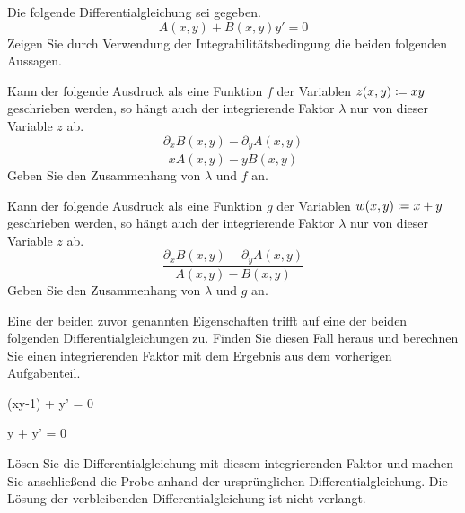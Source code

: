 \begin{atiTask}[
	title = Integrierende Faktoren,
	topic = Gewöhnliche Differentialgleichungen,
	subtopic = Exakte Differentialgleichungen: Der integrierende Faktor,
	language = Deutsch
]
	\begin{atiSubtasks}
		\item{
			Die folgende Differentialgleichung sei gegeben.
			\[
				A(x,y) + B(x,y)y' = 0
			\]
			Zeigen Sie durch Verwendung der Integrabilitätsbedingung die beiden folgenden Aussagen.
			\begin{atiItems}
				\item{
					Kann der folgende Ausdruck als eine Funktion $f$ der Variablen $z(x,y)\coloneqq xy$ geschrieben werden, so hängt auch der integrierende Faktor $\lambda$ nur von dieser Variable $z$ ab.
					\[
						\frac{\partial_x B(x,y) - \partial_y A(x,y)}{xA(x,y)-yB(x,y)}
					\]
					Geben Sie den Zusammenhang von $\lambda$ und $f$ an.
				}
				\item{
					Kann der folgende Ausdruck als eine Funktion $g$ der Variablen $w(x,y)\coloneqq x + y$ geschrieben werden, so hängt auch der integrierende Faktor $\lambda$ nur von dieser Variable $z$ ab.
					\[
						\frac{\partial_x B(x,y) - \partial_y A(x,y)}{A(x,y)-B(x,y)}
					\]
					Geben Sie den Zusammenhang von $\lambda$ und $g$ an.

				}
			\end{atiItems}
		}
		\item{
			Eine der beiden zuvor genannten Eigenschaften trifft auf eine der beiden folgenden Differentialgleichungen zu.
			Finden Sie diesen Fall heraus und berechnen Sie einen integrierenden Faktor mit dem Ergebnis aus dem vorherigen Aufgabenteil.
			\begin{atiSubequations}
				\item{
					(xy-1) + y' = 0
				}
				\item{
					y + y' = 0
				}
			\end{atiSubequations}
			Lösen Sie die Differentialgleichung mit diesem integrierenden Faktor und machen Sie anschließend die Probe anhand der ursprünglichen Differentialgleichung.
			Die Lösung der verbleibenden Differentialgleichung ist nicht verlangt.
		}
	\end{atiSubtasks}
\end{atiTask}